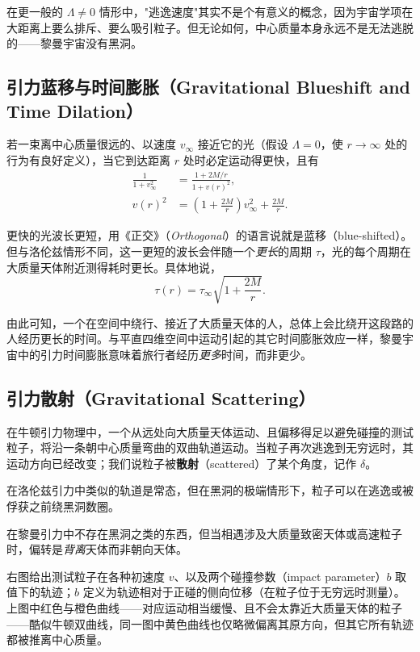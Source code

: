 在更一般的 $\Lambda\neq0$ 情形中，"逃逸速度"其实不是个有意义的概念，因为宇宙学项在大距离上要么排斥、要么吸引粒子。但无论如何，中心质量本身永远不是无法逃脱的——黎曼宇宙没有黑洞。

\subsection{引力蓝移与时间膨胀（Gravitational Blueshift and Time Dilation）}

若一束离中心质量很远的、以速度 $v_{\infty}$ 接近它的光（假设 $\Lambda=0$，使 $r\to\infty$ 处的行为有良好定义），当它到达距离 $r$ 处时必定运动得更快，且有
\begin{align*}
\frac{1}{1+v_{\infty}^{2}} &= \frac{1+2M/r}{1+v(r)^{2}},\\
v(r)^{2} &= \left(1+\frac{2M}{r}\right)v_{\infty}^{2}+\frac{2M}{r}.
\end{align*}

更快的光波长更短，用《正交》（\emph{Orthogonal}）的语言说就是蓝移（blue-shifted）。但与洛伦兹情形不同，这一更短的波长会伴随一个\emph{更长}的周期 $\tau$，光的每个周期在大质量天体附近测得耗时更长。具体地说，
\begin{equation*}
\tau(r)=\tau_{\infty}\sqrt{1+\frac{2M}{r}}.
\end{equation*}

由此可知，一个在空间中绕行、接近了大质量天体的人，总体上会比绕开这段路的人经历更长的时间。与平直四维空间中运动引起的其它时间膨胀效应一样，黎曼宇宙中的引力时间膨胀意味着旅行者经历\emph{更多}时间，而非更少。

\subsection{引力散射（Gravitational Scattering）}


在牛顿引力物理中，一个从远处向大质量天体运动、且偏移得足以避免碰撞的测试粒子，将沿一条朝中心质量弯曲的双曲轨道运动。当粒子再次逃逸到无穷远时，其运动方向已经改变；我们说粒子被\textbf{散射}（scattered）了某个角度，记作 $\delta$。

在洛伦兹引力中类似的轨道是常态，但在黑洞的极端情形下，粒子可以在逃逸或被俘获之前绕黑洞数圈。

在黎曼引力中不存在黑洞之类的东西，但当相遇涉及大质量致密天体或高速粒子时，偏转是\emph{背离}天体而非朝向天体。

右图给出测试粒子在各种初速度 $v$、以及两个碰撞参数（impact parameter）$b$ 取值下的轨迹；$b$ 定义为轨迹相对于正碰的侧向位移（在粒子位于无穷远时测量）。上图中红色与橙色曲线——对应运动相当缓慢、且不会太靠近大质量天体的粒子——酷似牛顿双曲线，同一图中黄色曲线也仅略微偏离其原方向，但其它所有轨迹都被推离中心质量。

